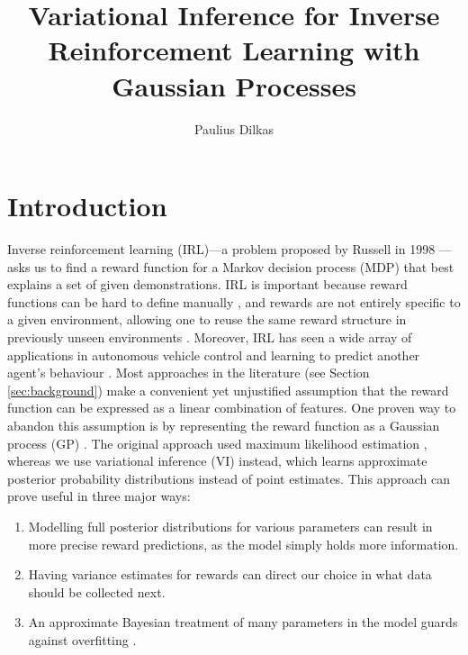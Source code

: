 \documentclass{mpaper}
\begin{document}

\title{Variational Inference for Inverse Reinforcement Learning with Gaussian Processes}
\author{Paulius Dilkas}
\maketitle

\begin{abstract}
\end{abstract}

\section{Introduction}

Inverse reinforcement learning (IRL)---a problem proposed by Russell in
1998 \cite{DBLP:conf/colt/Russell98}---asks us to find a reward function for a
Markov decision process (MDP) that best explains a set of given demonstrations.
IRL is important because reward functions can be hard to define manually
\cite{DBLP:conf/icml/PieterN04,DBLP:journals/corr/abs-1806-06877}, and rewards
are not entirely specific to a given environment, allowing one to reuse the same
reward structure in previously unseen environments
\cite{DBLP:journals/corr/abs-1806-06877,DBLP:conf/uai/JinDAS17,DBLP:conf/nips/LevinePK11}.
Moreover, IRL has seen a wide array of applications in autonomous vehicle
control \cite{DBLP:journals/ijsr/KimP16,DBLP:journals/ijrr/KretzschmarSSB16} and
learning to predict another agent's behaviour
\cite{DBLP:journals/ai/BogertD18,DBLP:conf/aaai/VogelRGR12,ziebart2008maximum,DBLP:conf/huc/ZiebartMDB08,DBLP:conf/iros/ZiebartRGMPBHDS09}.
Most approaches in the literature (see Section \ref{sec:background}) make a
convenient yet unjustified assumption that the reward function can be expressed
as a linear combination of features. One proven way to abandon this assumption
is by representing the reward function as a Gaussian process (GP)
\cite{DBLP:conf/uai/JinDAS17,DBLP:conf/nips/LevinePK11,DBLP:journals/corr/abs-1208-2112}.
The original approach used maximum likelihood estimation
\cite{DBLP:conf/nips/LevinePK11}, whereas we use variational inference (VI)
instead, which learns approximate posterior probability distributions instead of
point estimates. This approach can prove useful in three major ways:
\begin{enumerate}
\item Modelling full posterior distributions for various parameters can result
  in more precise reward predictions, as the model simply holds more
  information.
\item Having variance estimates for rewards can direct our choice in what data
  should be collected next.
\item An approximate Bayesian treatment of many parameters in the model guards
  against overfitting \cite{DBLP:conf/uai/JinDAS17}.
\end{enumerate}
\end{document}
